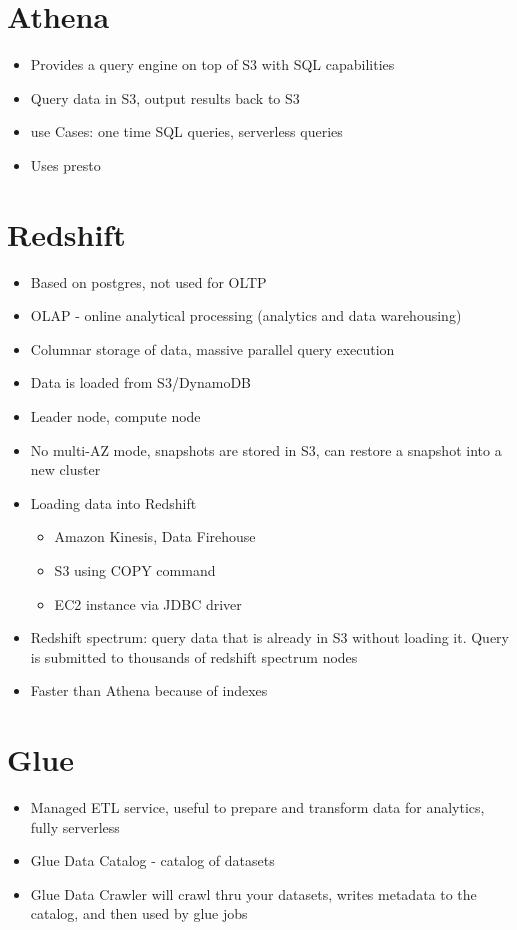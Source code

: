 \documentclass[]{scrartcl}
\begin{document}
\section{Athena}
\begin{itemize}
	\item Provides a query engine on top of S3 with SQL capabilities
	\item Query data in S3, output results back to S3
	\item use Cases: one time SQL queries, serverless queries
	\item Uses presto
\end{itemize}

\section{Redshift}
\begin{itemize}
	\item Based on postgres, not used for OLTP
	\item OLAP - online analytical processing (analytics and data warehousing)
	\item Columnar storage of data, massive parallel query execution
	\item Data is loaded from S3/DynamoDB
	\item Leader node, compute node
	\item No multi-AZ mode, snapshots are stored in S3, can restore a snapshot into a new cluster
	\item Loading data into Redshift
	\begin{itemize}
		\item Amazon Kinesis, Data Firehouse
		\item S3 using COPY command
		\item EC2 instance via JDBC driver
	\end{itemize}
	\item Redshift spectrum: query data that is already in S3 without loading it. Query is submitted to thousands of redshift spectrum nodes
	\item Faster than Athena because of indexes
\end{itemize}

\section{Glue}
\begin{itemize}
	\item Managed ETL service, useful to prepare and transform data for analytics, fully serverless
	\item Glue Data Catalog - catalog of datasets
	\item Glue Data Crawler will crawl thru your datasets, writes metadata to the catalog, and then used by glue jobs
\end{itemize}
\end{document}
